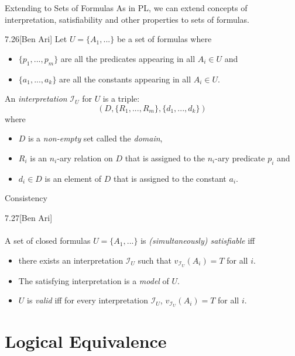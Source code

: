 \documentclass[style=sailor,size=12pt]{powerdot}
\begin{document}
\begin{wideslide}[bm=,toc=]{Extending to Sets of Formulas}
As in PL, we can extend concepts of interpretation, satisfiability and other
properties to sets of formulas.
\pause
\begin{defn}{7.26}[Ben Ari]
Let $U = \{A_1,...\}$ be a set of formulas where 
\begin{itemize}
\item<3-> $\{p_1,...,p_m\}$ are all the predicates appearing in all $A_i \in U$ and
\item<4-> $\{a_1,...,a_k\}$ are all the constants appearing in all $A_i \in U$. 
\end{itemize}
\pause[3]
An \emph{interpretation} $\mathcal{I}_U$ for $U$ is a triple:
\[(D, \{R_1,...,R_m\},\{d_1,...,d_k\})\]
\pause
where 
\begin{itemize}
\item<6-> $D$ is a \emph{non-empty} set called the \emph{domain}, 
\item<7-> $R_i$ is an $n_i$-ary relation on $D$ that is assigned to the $n_i$-ary predicate $p_i$ and 
\item<8-> $d_i \in D$ is an element of $D$ that is assigned to the constant $a_i$.
\end{itemize}
\end{defn}

\end{wideslide}

\begin{wideslide}[bm=,toc=]{Consistency}
\begin{defn}{7.27}[Ben Ari]~\\~\\
A set of closed formulas $U = \{A_1,...\}$ is \emph{(simultaneously)
  satisfiable} iff 
\begin{itemize}
\item<2-> there exists an interpretation $\mathcal{I}_U$ such that $v_{\mathcal{I}_U}(A_i) = T$ for all $i$. 
\item<3-> The satisfying interpretation is a \emph{model} of $U$.
\item<4-> $U$ is \emph{valid} iff for every interpretation
  $\mathcal{I}_U$, $v_{\mathcal{I}_U}(A_i) = T$ for all $i$.
\end{itemize}
\end{defn}
\end{wideslide}

\section[slide=true]{Logical Equivalence}
\end{document}
